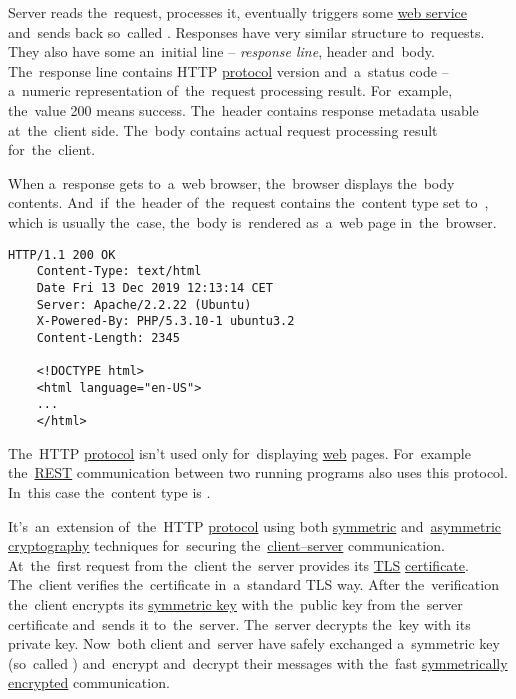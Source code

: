 Server reads the~request, processes it, eventually triggers some \hyperref[webserviceapplication]{web service} and~sends back so~called .
Responses have very similar structure to~requests.
They also have some an~initial line -- \textit{response line}, header and~body.
The~response line contains HTTP \hyperref[protocolstandard]{protocol} version and~a~status code --  a~numeric representation of~the~request processing result.
For~example, the~value 200 means success.
The~header contains response metadata usable at~the~client side.
The~body contains actual request processing result for~the~client.

When a~response gets to~a~web browser, the~browser displays the~body contents.
And~if~the~header of~the~request contains the~content type set to~, which is usually the~case, the~body is~rendered as~a~web page in~the~browser.

\begin{lstlisting}[title={Example of a~HTTP response}]
    HTTP/1.1 200 OK
    Content-Type: text/html
    Date Fri 13 Dec 2019 12:13:14 CET
    Server: Apache/2.2.22 (Ubuntu)
    X-Powered-By: PHP/5.3.10-1 ubuntu3.2
    Content-Length: 2345

    <!DOCTYPE html>
    <html language="en-US">
    ...
    </html>
\end{lstlisting}
\notenonl The~HTTP \hyperref[protocolstandard]{protocol} isn't used only for~displaying \hyperref[internetweb]{web} pages.
For~example the~\hyperref[rest]{REST} communication between two running programs also uses this protocol.
In~this case the~content type is .

\label{https}
It's~an~extension of~the~HTTP \hyperref[protocolstandard]{protocol} using both \hyperref[symmetriccryptography]{symmetric} and~\hyperref[asymmetriccryptography]{asymmetric} \hyperref[cryptography]{cryptography} techniques for~securing the~\hyperref[clientserverarchitecture]{client--server} communication.
At~the~first request from the~client the~server provides its \hyperref[tls]{TLS} \hyperref[certificate]{certificate}.
The~client verifies the~certificate in~a~standard TLS way.
After the~verification the~client encrypts its \hyperref[symmetriccryptography]{symmetric key} with the~public key from the~server certificate and~sends it to~the~server.
The~server decrypts the~key with its private key.
Now~both client and~server have safely exchanged a~symmetric key (so~called ) and~encrypt and~decrypt their messages with the~fast \hyperref[symmetriccryptography]{symmetrically encrypted} communication.

